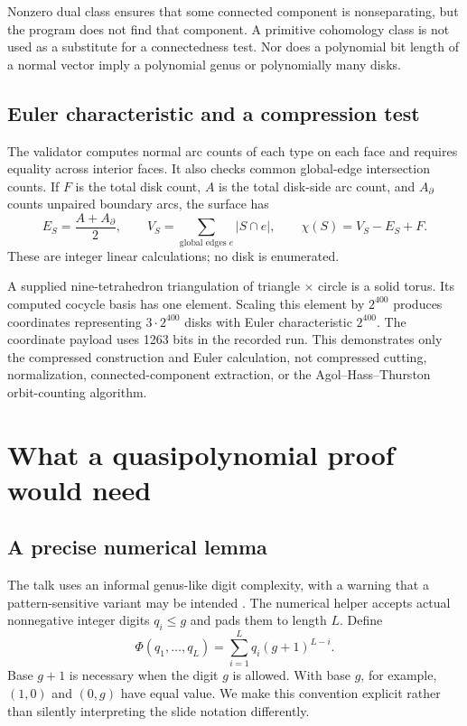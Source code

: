\documentclass[11pt]{article}
\theoremstyle{definition}
\begin{document}
Nonzero dual class ensures that some connected component is nonseparating, but
the program does not find that component. A primitive cohomology class is not
used as a substitute for a connectedness test. Nor does a polynomial bit length
of a normal vector imply a polynomial genus or polynomially many disks.

\subsection{Euler characteristic and a compression test}

The validator computes normal arc counts of each type on each face and
requires equality across interior faces. It also checks common global-edge
intersection counts. If $F$ is the total disk count, $A$ is the total disk-side
arc count, and $A_{\partial}$ counts unpaired boundary arcs, the surface has
\[
 E_S=\frac{A+A_{\partial}}2,
 \qquad V_S=\sum_{\text{global edges }e}|S\cap e|,
 \qquad \chi(S)=V_S-E_S+F.
\]
These are integer linear calculations; no disk is enumerated.

A supplied nine-tetrahedron triangulation of triangle $\times$ circle is a
solid torus. Its computed cocycle basis has one element. Scaling this element
by $2^{400}$ produces coordinates representing $3\cdot2^{400}$ disks with
Euler characteristic $2^{400}$. The coordinate payload uses 1263 bits in the
recorded run. This demonstrates only the compressed construction and Euler
calculation, not compressed cutting, normalization, connected-component
extraction, or the Agol--Hass--Thurston orbit-counting algorithm.

\section{What a quasipolynomial proof would need}

\subsection{A precise numerical lemma}

The talk uses an informal genus-like digit complexity, with a warning that a
pattern-sensitive variant may be intended \cite[pp.~54--65]{slides}. The
numerical helper accepts actual nonnegative integer digits $q_i\le g$ and pads
them to length $L$. Define
\[
 \Phi(q_1,\ldots,q_L)=\sum_{i=1}^L q_i(g+1)^{L-i}.
\]
Base $g+1$ is necessary when the digit $g$ is allowed. With base $g$, for
example, $(1,0)$ and $(0,g)$ have equal value. We make this convention explicit
rather than silently interpreting the slide notation differently.
\end{document}
